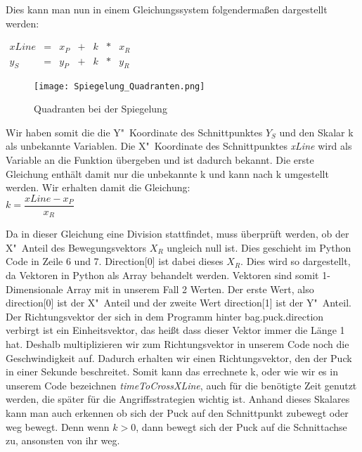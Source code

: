 Dies kann man nun in einem Gleichungssystem folgendermaßen dargestellt werden: 

$
\begin{array}{ccccccc}
xLine & = & x_P & + & k & * & x_R \\
y_S & = & y_P & + & k & * & y_R
\end{array}
$ 

\begin{wrapfigure}{R}{0pt}
	\vspace{-15pt}
	\texttt{[image: Spiegelung\_Quadranten.png]}
	\vspace{-15pt}
	\caption{Quadranten bei der Spiegelung}
	\vspace{-15pt}
	\label{img:Quadranten}
\end{wrapfigure}

Wir haben somit die die Y"~Koordinate des Schnittpunktes $Y_S$ und den Skalar k als unbekannte Variablen. Die X"~Koordinate des Schnittpunktes \textit{xLine} wird als Variable an die Funktion übergeben und ist dadurch bekannt. Die erste Gleichung enthält damit nur die unbekannte k und kann nach k umgestellt werden. Wir erhalten damit die Gleichung: \\
$k = \dfrac{xLine - x_P}{x_R}$

Da in dieser Gleichung eine Division stattfindet, muss überprüft werden, ob der X"~Anteil des Bewegungsvektors $X_R$ ungleich null ist. Dies geschieht im Python Code in Zeile 6 und 7. Direction[0] ist dabei dieses $X_R$. Dies wird so dargestellt, da Vektoren in Python als Array behandelt werden. Vektoren sind somit 1-Dimensionale Array mit in unserem Fall 2 Werten. Der erste Wert, also direction[0] ist der X"~Anteil und der zweite Wert direction[1] ist der Y"~Anteil. Der Richtungsvektor der sich in dem Programm hinter bag.puck.direction verbirgt ist ein Einheitsvektor, das heißt dass dieser Vektor immer die Länge 1 hat. Deshalb multiplizieren wir zum Richtungsvektor in unserem Code noch die Geschwindigkeit auf. Dadurch erhalten wir einen Richtungsvektor, den der Puck in einer Sekunde beschreitet. Somit kann das errechnete k, oder wie wir es in unserem Code bezeichnen \textit{timeToCrossXLine}, auch für die benötigte Zeit genutzt werden, die später für die Angriffsstrategien wichtig ist. Anhand dieses Skalares kann man auch erkennen ob sich der Puck auf den Schnittpunkt zubewegt oder weg bewegt. Denn wenn $k>0$, dann bewegt sich der Puck auf die Schnittachse zu, ansonsten von ihr weg. 

